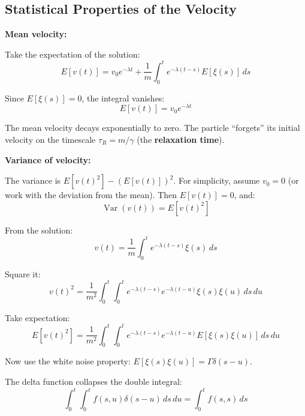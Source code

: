 \documentclass[11pt,a4paper]{article}
\begin{document}
	\subsection{Statistical Properties of the Velocity}
	
	\textbf{Mean velocity:}
	
	Take the expectation of the solution:
	\begin{equation}
		E[v(t)] = v_0 e^{-\lambda t} + \frac{1}{m} \int_0^t e^{-\lambda(t-s)} E[\xi(s)] \, ds
	\end{equation}
	
	Since $E[\xi(s)] = 0$, the integral vanishes:
	\begin{equation}
		E[v(t)] = v_0 e^{-\lambda t}
	\end{equation}
	
	The mean velocity decays exponentially to zero. The particle ``forgets'' its initial velocity on the timescale $\tau_R = m/\gamma$ (the \textbf{relaxation time}).
	
	\textbf{Variance of velocity:}
	
	The variance is $E[v(t)^2] - (E[v(t)])^2$. For simplicity, assume $v_0 = 0$ (or work with the deviation from the mean). Then $E[v(t)] = 0$, and:
	\begin{equation}
		\operatorname{Var}(v(t)) = E[v(t)^2]
	\end{equation}
	
	From the solution:
	\begin{equation}
		v(t) = \frac{1}{m} \int_0^t e^{-\lambda(t-s)} \xi(s) \, ds
	\end{equation}
	
	Square it:
	\begin{equation}
		v(t)^2 = \frac{1}{m^2} \int_0^t \int_0^t e^{-\lambda(t-s)} e^{-\lambda(t-u)} \xi(s) \xi(u) \, ds \, du
	\end{equation}
	
	Take expectation:
	\begin{equation}
		E[v(t)^2] = \frac{1}{m^2} \int_0^t \int_0^t e^{-\lambda(t-s)} e^{-\lambda(t-u)} E[\xi(s)\xi(u)] \, ds \, du
	\end{equation}
	
	Now use the white noise property: $E[\xi(s)\xi(u)] = \Gamma \delta(s-u)$.
	
	The delta function collapses the double integral:
	\begin{equation}
		\int_0^t \int_0^t f(s,u) \delta(s-u) \, ds \, du = \int_0^t f(s,s) \, ds
	\end{equation}
	
\end{document}
